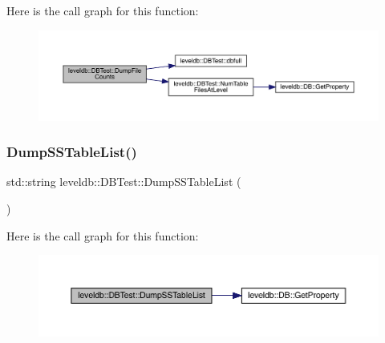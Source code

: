 Here is the call graph for this function\+:
\nopagebreak
\begin{figure}[H]
\begin{center}
\leavevmode
\includegraphics[width=350pt]{classleveldb_1_1_d_b_test_ad045c5203b4ea785ab335ffc3ea833b3_cgraph}
\end{center}
\end{figure}
\mbox{\label{classleveldb_1_1_d_b_test_afdfc077be555dea7eac220623f6d4deb}} 
\subsubsection{\texorpdfstring{DumpSSTableList()}{DumpSSTableList()}}
{\footnotesize\ttfamily std\+::string leveldb\+::\+D\+B\+Test\+::\+Dump\+S\+S\+Table\+List (\begin{DoxyParamCaption}{ }\end{DoxyParamCaption})\hspace{0.3cm}{\ttfamily [inline]}}

Here is the call graph for this function\+:
\nopagebreak
\begin{figure}[H]
\begin{center}
\leavevmode
\includegraphics[width=350pt]{classleveldb_1_1_d_b_test_afdfc077be555dea7eac220623f6d4deb_cgraph}
\end{center}
\end{figure}
\mbox{\label{classleveldb_1_1_d_b_test_a0e4d6292bcbe450d34b558d48a51a331}} 
